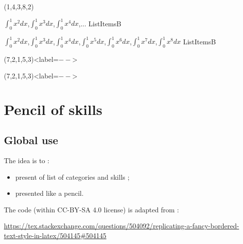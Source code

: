 \documentclass[english,11pt,a4paper]{article}
\begin{document}
\begin{demohigh}[language=latex/latex3,style/main=teal!25,style/code=teal!25]
(1,4,3,8,2)
\end{demohigh}

\begin{codehigh}[language=latex/latex3,style/main=teal!25,style/code=teal!25]
\CreateItemsList%
    {{$\int_0^1 x^2 dx$},{$\int_0^1 x^3 dx$},{$\int_0^1 x^4 dx$},...}%
    {\mylistofitemsb}{ListItemsB}
\end{codehigh}

\CreateItemsList%
{{$\int_0^1 x^2 dx$},{$\int_0^1 x^3 dx$},{$\int_0^1 x^4 dx$},{$\int_0^1 x^5 dx$},{$\int_0^1 x^6 dx$},{$\int_0^1 x^7 dx$},{$\int_0^1 x^8 dx$}}%
{\mylistofitemsb}{ListItemsB}

\begin{codehigh}[language=latex/latex3,style/main=teal!25,style/code=teal!25]
(7,2,1,5,3)<label=$--$>
\end{codehigh}

(7,2,1,5,3)<label=$--$>

\pagebreak

\section{Pencil of skills}

\subsection{Global use}

The idea is to :

\begin{itemize}
	\item present of list of categories and skills ;
	\item presented like a pencil.
\end{itemize}

The code (within CC-BY-SA 4.0 license) is adapted from :

\hfill{\footnotesize \url{https://tex.stackexchange.com/questions/504092/replicating-a-fancy-bordered-text-style-in-latex/504145#504145}}\hfill~

\begin{codehigh}[language=latex/latex3,style/main=teal!25,style/code=teal!25]
\end{codehigh}
\end{document}
